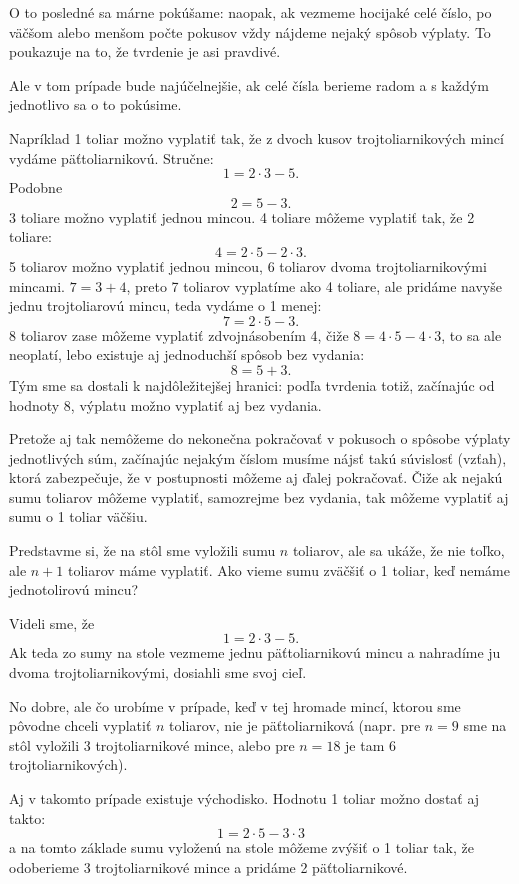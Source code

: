 {{O to posledné sa márne pokúšame: naopak, ak vezmeme hocijaké celé číslo, po väčšom alebo menšom počte pokusov vždy nájdeme nejaký spôsob výplaty. To poukazuje na to, že tvrdenie je asi pravdivé. 

Ale v tom prípade bude najúčelnejšie, ak celé čísla berieme radom a s každým jednotlivo sa o to pokúsime.

Napríklad 1 toliar možno vyplatiť tak, že z dvoch kusov trojtoliarnikových mincí vydáme päťtoliarnikovú. Stručne: 
$$1=2\cdot 3 -5.$$
Podobne $$2=5-3.$$
3 toliare možno vyplatiť jednou mincou. 
4 toliare môžeme vyplatiť tak, že  2 toliare:
$$4=2\cdot 5 - 2\cdot 3.$$
5 toliarov možno vyplatiť jednou mincou, 6 toliarov dvoma trojtoliarnikovými mincami.
$7=3+4$, preto 7 toliarov vyplatíme ako 4 toliare, ale pridáme navyše jednu trojtoliarovú mincu, teda vydáme o 1 menej: $$7=2\cdot 5 - 3.$$ 
8 toliarov zase môžeme vyplatiť zdvojnásobením 4, čiže $8=4\cdot 5- 4\cdot 3$, to sa ale neoplatí, lebo existuje aj jednoduchší spôsob bez vydania: $$8=5+3.$$
Tým sme sa dostali k najdôležitejšej hranici: podľa tvrdenia totiž, začínajúc od hodnoty 8, výplatu možno vyplatiť aj bez vydania.

Pretože aj tak nemôžeme do nekonečna pokračovať v pokusoch o spôsobe výplaty jednotlivých súm, začínajúc nejakým číslom musíme nájsť takú súvislosť (vzťah), ktorá zabezpečuje, že v postupnosti môžeme aj ďalej pokračovať. Čiže ak nejakú sumu toliarov môžeme vyplatiť, samozrejme bez vydania, tak môžeme vyplatiť aj sumu o 1 toliar väčšiu. 

Predstavme si, že na stôl sme vyložili sumu $n$ toliarov, ale sa ukáže, že nie toľko, ale $n+1$ toliarov máme vyplatiť. Ako vieme sumu zväčšiť o 1 toliar, keď nemáme jednotolirovú mincu? 

Videli sme, že 
$$1=2\cdot 3- 5.$$
Ak teda zo sumy na stole vezmeme jednu päťtoliarnikovú mincu a nahradíme ju dvoma trojtoliarnikovými, dosiahli sme svoj cieľ.

No dobre, ale čo urobíme v prípade, keď v tej hromade mincí, ktorou sme pôvodne chceli vyplatiť $n$ toliarov, nie je päťtoliarniková (napr. pre $n=9$ sme na stôl vyložili 3 trojtoliarnikové mince, alebo pre $n=18$ je tam 6 trojtoliarnikových).

Aj v takomto prípade existuje východisko. Hodnotu 1 toliar možno dostať aj takto: $$1=2\cdot 5 - 3\cdot 3$$ a na tomto základe sumu vyloženú na stole môžeme zvýšiť o 1 toliar tak, že odoberieme 3 trojtoliarnikové mince a pridáme 2 päťtoliarnikové.

}}
